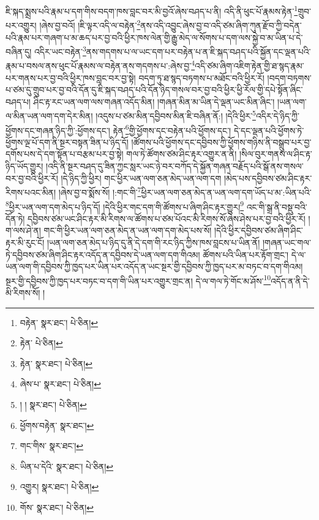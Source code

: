 ཇི་སྐད་སྨྲས་པའི་རྣམ་པ་དག་གིས་བདག་ཁས་བླང་བར་མི་བྱའོ་ཞེས་བཤད་པ་ནི། འདི་ནི་ཕུང་པོ་རྣམས་རྟེན་\footnote{བརྟེན་  སྣར་ཐང་།  པེ་ཅིན། }གྲུབ་པར་འགྱུར། །ཞེས་བྱ་བའོ། །ཇི་ལྟར་འདི་ལ་བརྟེན་\footnote{རྟེན་  པེ་ཅིན། }ནས་འདི་འབྱུང་ཞེས་བྱ་བ་འདི་ཙམ་ཞིག་ཀུན་རྫོབ་ཀྱི་བདེན་པའི་རྣམ་པར་གཞག་པ་མ་ཆད་པར་བྱ་བའི་ཕྱིར་ཁས་ལེན་གྱི་རྒྱུ་མེད་ལ་སོགས་པ་དག་ལས་སྐྱེ་བ་མ་ཡིན་པ་དེ་བཞིན་དུ། འདིར་ཡང་བརྟེན་\footnote{རྟེན་  སྣར་ཐང་།  པེ་ཅིན། }ནས་གདགས་པ་ལ་ཡང་དག་པར་བརྟེན་པ་ན་ཇི་སྐད་བཤད་པའི་སྐྱོན་དང་ལྡན་པའི་རྣམ་པ་བསལ་ནས་ཕུང་པོ་རྣམས་ལ་བརྟེན་ནས་གདགས་པ་:ཞེས་བྱ་\footnote{ཞེས་པ་  སྣར་ཐང་།  པེ་ཅིན། }འདི་ཙམ་ཞིག་འཇིག་རྟེན་གྱི་ཐ་སྙད་རྣམ་པར་གནས་པར་བྱ་བའི་ཕྱིར་ཁས་བླང་བར་བྱ་སྟེ། བདག་ཏུ་ཐ་སྙད་བཏགས་པ་མཐོང་བའི་ཕྱིར་རོ། །བདག་བཏགས་པ་ཙམ་དུ་གྲུབ་པར་བྱ་བའི་དོན་དུ་ཇི་སྐད་བཤད་པའི་དོན་ཉིད་གསལ་བར་བྱ་བའི་ཕྱིར་ཕྱི་རོལ་གྱི་དཔེ་སྟོན་ཞིང་བཤད་པ། ཤིང་རྟ་རང་ཡན་ལག་ལས་གཞན་འདོད་མིན། །གཞན་མིན་མ་ཡིན་དེ་ལྡན་ཡང་མིན་ཞིང་། །ཡན་ལག་ལ་མིན་ཡན་ལག་དག་དེར་མིན། །འདུས་པ་ཙམ་མིན་དབྱིབས་མིན་ཇི་བཞིན་ནོ:། །དེའི་ཕྱིར་\footnote{། །  སྣར་ཐང་།  པེ་ཅིན། }འདིར་དེ་ཉིད་ཀྱི་ཕྱོགས་དང་གཞན་ཉིད་ཀྱི་:ཕྱོགས་དང་། རྟེན་\footnote{ཕྱོགས་བརྟེན་  སྣར་ཐང་། }གྱི་ཕྱོགས་དང་བརྟེན་པའི་ཕྱོགས་དང་། དེ་དང་ལྡན་པའི་ཕྱོགས་ཏེ་ཕྱོགས་ལྔ་པོ་དག་ནི་སྔར་བསྟན་ཟིན་པ་ཉིད་དོ། །ཚོགས་པའི་ཕྱོགས་དང་དབྱིབས་ཀྱི་ཕྱོགས་གཉིས་ནི་བསྒྲུབ་པར་བྱ་དགོས་པས་དེ་དག་སྟོན་པ་བརྩམ་པར་བྱ་སྟེ། གལ་ཏེ་ཚོགས་ཙམ་ཤིང་རྟར་འགྱུར་ན་ནི། །སིལ་བུར་གནས་ལ་ཤིང་རྟ་ཉིད་ཡོད་གྱུར། །འདི་ནི་སྔར་བཤད་དུ་ཟིན་ཀྱང་སླར་ཡང་ཉེ་བར་བཀོད་དེ་སྐྱོན་གཞན་བརྗོད་པའི་སྒོ་ནས་གསལ་བར་བྱ་བའི་ཕྱིར་རོ། །དེ་ཉིད་ཀྱི་ཕྱིར། གང་ཕྱིར་ཡན་ལག་ཅན་མེད་ཡན་ལག་དག །མེད་པས་དབྱིབས་ཙམ་ཤིང་རྟར་རིགས་པའང་མིན། །ཞེས་བྱ་བ་སྨོས་སོ། །:གང་གི་\footnote{གང་གིས་  སྣར་ཐང་། }ཕྱིར་ཡན་ལག་ཅན་མེད་ན་ཡན་ལག་དག་ཡོད་པ་མ་:ཡིན་པའི་\footnote{ཡིན་པ་དེའི་  སྣར་ཐང་།  པེ་ཅིན། }ཕྱིར་ཡན་ལག་དག་མེད་པ་ཉིད་དོ། །དེའི་ཕྱིར་གང་དག་གི་ཚོགས་པ་ཞིག་ཤིང་རྟར་གྱུར།\footnote{འགྱུར།  སྣར་ཐང་།  པེ་ཅིན། } འང་གི་སྒྲ་ནི་བསྡུ་བའི་དོན་ཏེ། དབྱིབས་ཙམ་ཡང་ཤིང་རྟར་མི་རིགས་ལ་ཚོགས་པ་ཙམ་པོའང་མི་རིགས་སོ་ཞེས་ཤེས་པར་བྱ་བའི་ཕྱིར་རོ། །ག་ལས་ཤེ་ན། གང་གི་ཕྱིར་ཡན་ལག་ཅན་མེད་ན་ཡན་ལག་དག་མེད་པས་སོ། །དེའི་ཕྱིར་དབྱིབས་ཙམ་ཞིག་ཤིང་རྟར་མི་རུང་ངོ། །ཡན་ལག་ཅན་མེད་པ་ཉིད་དུ་ནི་དེ་དག་གི་རང་ཉིད་ཀྱིས་ཁས་བླངས་པ་ཡིན་ནོ། །གཞན་ཡང་གལ་ཏེ་དབྱིབས་ཙམ་ཞིག་ཤིང་རྟར་འདོད་ན་དབྱིབས་དེ་ཡན་ལག་དག་གིའམ། ཚོགས་པའི་ཡིན་པར་རྟོག་གྲང་། དེ་ལ་ཡན་ལག་གི་དབྱིབས་ཀྱི་ཁྱད་པར་ཡིན་པར་འདོད་ན་ཡང་སྔར་གྱི་དབྱིབས་ཀྱི་ཁྱད་པར་མ་བཏང་བ་དག་གིའམ། སྔར་གྱི་དབྱིབས་ཀྱི་ཁྱད་པར་བཏང་བ་དག་གི་ཡིན་པར་འགྱུར་གྲང་ན། དེ་ལ་གལ་ཏེ་གོང་མ་ཤོས་\footnote{གོས་  སྣར་ཐང་།  པེ་ཅིན། }འདོད་ན་ནི་དེ་མི་རིགས་སོ། །
